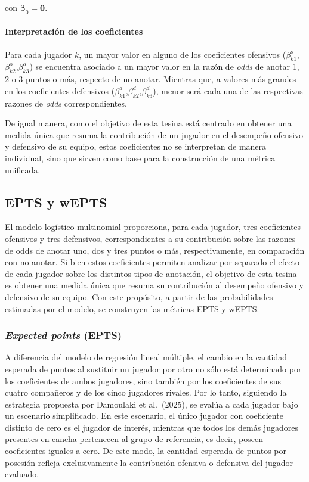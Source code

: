\documentclass[
  12pt,
]{article}
\begin{document}
con \(\boldsymbol{\beta}_0 = \boldsymbol{0}\).

\paragraph{Interpretación de los
coeficientes}\label{interpretaciuxf3n-de-los-coeficientes-1}

Para cada jugador \(k\), un mayor valor en alguno de los coeficientes
ofensivos (\(\beta_{k1}^o\),\(\beta_{k2}^o\),\(\beta_{k3}^o\)) se
encuentra asociado a un mayor valor en la razón de \emph{odds} de anotar
1, 2 o 3 puntos o más, respecto de no anotar. Mientras que, a valores
más grandes en los coeficientes defensivos
(\(\beta_{k1}^d\),\(\beta_{k2}^d\),\(\beta_{k3}^d\)), menor será cada
una de las respectivas razones de \emph{odds} correspondientes.

De igual manera, como el objetivo de esta tesina está centrado en
obtener una medida única que resuma la contribución de un jugador en el
desempeño ofensivo y defensivo de su equipo, estos coeficientes no se
interpretan de manera individual, sino que sirven como base para la
construcción de una métrica unificada.

\subsection{EPTS y wEPTS}\label{epts-y-wepts}

El modelo logístico multinomial proporciona, para cada jugador, tres
coeficientes ofensivos y tres defensivos, correspondientes a su
contribución sobre las razones de odds de anotar uno, dos y tres puntos
o más, respectivamente, en comparación con no anotar. Si bien estos
coeficientes permiten analizar por separado el efecto de cada jugador
sobre los distintos tipos de anotación, el objetivo de esta tesina es
obtener una medida única que resuma su contribución al desempeño
ofensivo y defensivo de su equipo. Con este propósito, a partir de las
probabilidades estimadas por el modelo, se construyen las métricas EPTS
y wEPTS.

\subsubsection{\texorpdfstring{\emph{Expected points}
(EPTS)}{Expected points (EPTS)}}\label{expected-points-epts}

A diferencia del modelo de regresión lineal múltiple, el cambio en la
cantidad esperada de puntos al sustituir un jugador por otro no sólo
está determinado por los coeficientes de ambos jugadores, sino también
por los coeficientes de sus cuatro compañeros y de los cinco jugadores
rivales. Por lo tanto, siguiendo la estrategia propuesta por Damoulaki
et al.~(2025), se evalúa a cada jugador bajo un escenario simplificado.
En este escenario, el único jugador con coeficiente distinto de cero es
el jugador de interés, mientras que todos los demás jugadores presentes
en cancha pertenecen al grupo de referencia, es decir, poseen
coeficientes iguales a cero. De este modo, la cantidad esperada de
puntos por posesión refleja exclusivamente la contribución ofensiva o
defensiva del jugador evaluado.
\end{document}
